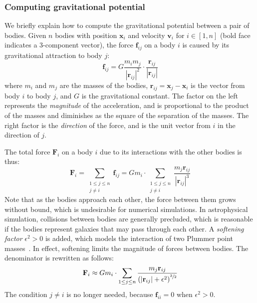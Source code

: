 \subsubsection{Computing gravitational potential}

We briefly explain how to compute the gravitational potential between a pair of
bodies. Given $n$ bodies with position $\mathbf{x}_i$ and velocity
$\mathbf{v}_i$ for $i \in [1,n]$ (bold face indicates a 3-component vector), the
force $\mathbf{f}_{ij}$ on a body $i$ is caused by its gravitational attraction
to body $j$:
%
\begin{equation*}
    \mathbf{f}_{ij}
      = G \frac{m_i m_j}{\left|\mathbf{r}_{ij}\right|^2}
        \cdot
        \frac{\mathbf{r}_{ij}}{\left|\mathbf{r}_{ij}\right|}
\end{equation*}
%
where $m_i$ and $m_j$ are the masses of the bodies, $\mathbf{r}_{ij} =
\mathbf{x}_j - \mathbf{x}_i$ is the vector from body $i$ to body $j$, and $G$ is
the gravitational constant. The factor on the left represents the
\emph{magnitude} of the acceleration, and is proportional to the product of the
masses and diminishes as the square of the separation of the masses. The right
factor is the \emph{direction} of the force, and is the unit vector from $i$ in
the direction of $j$.

The total force $\mathbf{F}_i$ on a body $i$ due to its interactions with the
other bodies is thus:
%
\begin{equation*}
    \mathbf{F}_i
      = \sum_{\substack{1 \le j \le n\\j \ne i}} \mathbf{f}_{ij}
      = G m_i \cdot \sum_{\substack{1 \le j \le n\\j \ne i}}
            \frac{m_j \mathbf{r}_{ij}}{\left|\mathbf{r}_{ij}\right|^3}
\end{equation*}
%
Note that as the bodies approach each other, the force between them grows
without bound, which is undesirable for numerical simulations. In astrophysical
simulation, collisions between bodies are generally precluded, which is
reasonable if the bodies represent galaxies that may pass through each other. A
\emph{softening factor} $\epsilon^2 > 0$ is added, which models the interaction
of two Plummer point masses~\cite{Aarseth:2003uz,Dyer:1993bk}. In effect,
softening limits the magnitude of forces between bodies. The denominator is
rewritten as follows:
%
\begin{equation*}
    \mathbf{F}_i \approx G m_i \cdot \sum_{1 \le j \le n}
        \frac{m_j \mathbf{r}_{ij}}
             {\left( \left|\mathbf{r}_{ij}\right| + \epsilon^2 \right)^{\sfrac{3}{2}}}
\end{equation*}
%
The condition $j \ne i$ is no longer needed, because $\mathbf{f}_{ii} = 0$ when
$\epsilon^2 > 0$.

